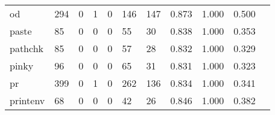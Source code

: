 \begin{longtable}{lp{1.2cm}p{1.2cm}p{1.2cm}p{1.2cm}p{1.2cm}p{1.2cm}p{1.2cm}p{1.2cm}p{1.2cm}p{1.2cm}}
od        &                                   294 &                                                  0 &                                                  1 &                                                  0 &                                                146 &                                                147 &                                              0.873 &                                              1.000 &                                              0.500 \\
paste     &                                    85 &                                                  0 &                                                  0 &                                                  0 &                                                 55 &                                                 30 &                                              0.838 &                                              1.000 &                                              0.353 \\
pathchk   &                                    85 &                                                  0 &                                                  0 &                                                  0 &                                                 57 &                                                 28 &                                              0.832 &                                              1.000 &                                              0.329 \\
pinky     &                                    96 &                                                  0 &                                                  0 &                                                  0 &                                                 65 &                                                 31 &                                              0.831 &                                              1.000 &                                              0.323 \\
pr        &                                   399 &                                                  0 &                                                  1 &                                                  0 &                                                262 &                                                136 &                                              0.834 &                                              1.000 &                                              0.341 \\
printenv  &                                    68 &                                                  0 &                                                  0 &                                                  0 &                                                 42 &                                                 26 &                                              0.846 &                                              1.000 &                                              0.382 \\

\end{longtable}
